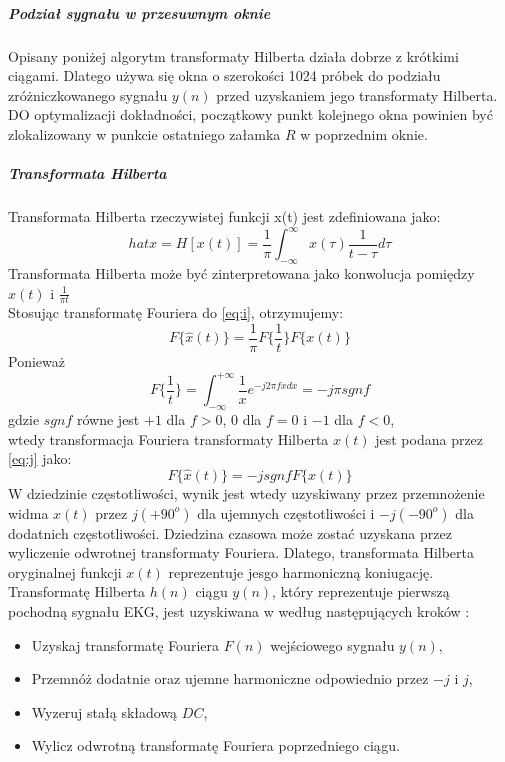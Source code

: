 \documentclass[a4paper, 11pt]{article}
\begin{document}
\subparagraph{Podział sygnału w przesuwnym oknie}
Opisany poniżej algorytm transformaty Hilberta działa dobrze z krótkimi ciągami. Dlatego używa się okna o szerokości 1024 próbek do podziału zróżniczkowanego sygnału $y(n)$ przed uzyskaniem jego transformaty Hilberta. DO optymalizacji dokładności, początkowy punkt kolejnego okna powinien być zlokalizowany w punkcie ostatniego załamka $R$ w poprzednim oknie. 
\subparagraph{Transformata Hilberta}
Transformata Hilberta rzeczywistej funkcji x(t) jest zdefiniowana jako:
\begin{equation}
hat{x}=H[x(t)]=\frac{1}{\pi}\int_{-\infty}^\infty x(\tau)\frac{1}{t -\tau}d\tau \label{eq:i}
\end{equation}
Transformata Hilberta może być zinterpretowana jako konwolucja pomiędzy $x(t)$ i $\frac{1}{\pi t}$\\
Stosując transformatę Fouriera do \eqref{eq:i}, otrzymujemy:
\begin{equation}
F\lbrace \hat{x}(t)\rbrace= \frac{1}{\pi} F \lbrace \frac{1}{t} \rbrace F \lbrace x(t) \rbrace \label{eq:j}
\end{equation}
Ponieważ 
\begin{equation}
F\lbrace \frac{1}{t} \rbrace = \int_{-\infty}^{+\infty} \frac{1}{x} e^{-j 2 \pi fxdx} = -j \pi sgn f  \label{eq:k}
\end{equation}
gdzie $sgn f$ równe jest $+1$ dla $f > 0$, $0$ dla $f = 0$ i $-1$ dla $f<0$,\\
wtedy transformacja Fouriera transformaty Hilberta $x(t)$ jest podana przez \eqref{eq:j} jako:
\begin{equation}
F \lbrace \hat{x}(t) \rbrace= -j sgn f F \lbrace x(t) \rbrace \label{eq:l}
\end{equation}
W dziedzinie częstotliwości, wynik jest wtedy uzyskiwany przez przemnożenie widma $x(t)$ przez $j(+90^o)$ dla ujemnych częstotliwości i $-j(-90^o)$ dla dodatnich częstotliwości. Dziedzina czasowa może zostać uzyskana przez wyliczenie odwrotnej transformaty Fouriera. Dlatego, transformata Hilberta oryginalnej funkcji $x(t)$ reprezentuje jesgo harmoniczną koniugację.\\
Transformatę Hilberta $h(n)$ ciągu $y(n)$, który reprezentuje pierwszą pochodną sygnału EKG, jest uzyskiwana w według następujących kroków :
\begin{itemize}
		\item Uzyskaj transformatę Fouriera $F(n)$ wejściowego sygnału $y(n)$,
		\item Przemnóż dodatnie oraz ujemne harmoniczne odpowiednio przez $-j$ i $j$,
		\item Wyzeruj stałą składową $DC$,
		\item Wylicz odwrotną transformatę Fouriera poprzedniego ciągu.
\end{itemize}
\end{document}
